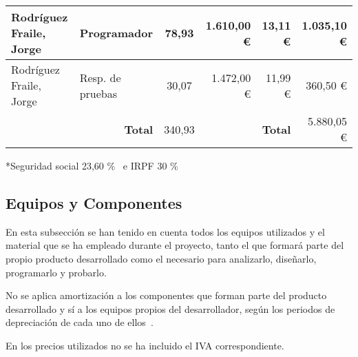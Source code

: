 \begin{table}[H]
{\begin{tabular}{ll|c|rr|r|}
			\multicolumn{1}{|l|}{Rodríguez Fraile, Jorge}                             & Programador                                                 & 78,93                                   & \multicolumn{1}{r|}{1.610,00 €}                              & 13,11 €                                                                              & 1.035,10 €                                                                           \\ \hline
			\multicolumn{1}{|l|}{Rodríguez Fraile, Jorge}                             & Resp. de pruebas                                            & 30,07                                   & \multicolumn{1}{r|}{1.472,00 €}                              & 11,99 €                                                                              & 360,50   €                                                                           \\ \hline
			                                                                          & \multicolumn{1}{r|}{\textbf{Total}}                         & 340,93                                  & \multicolumn{1}{l}{}                                         & \textbf{Total}                                                                       & 5.880,05 €                                                                           \\ \cline{3-3} \cline{6-6}
		\end{tabular}%
	}
\end{table}

*Seguridad social 23,60 \%~\cite{ministerio_de_inclusion_seguridad_social_y_migraciones_bases_nodate} e IRPF 30 \%~\cite{trecet_irpf_nodate}

\subsection{Equipos y Componentes}\label{subsec:equipos-y-componentes}
En esta subsección se han tenido en cuenta todos los equipos utilizados y el material que se ha empleado durante el proyecto, tanto el que formará parte del propio producto desarrollado como el necesario para analizarlo, diseñarlo, programarlo y probarlo.

No se aplica amortización a los componentes que forman parte del producto desarrollado y sí a los equipos propios del desarrollador, según los periodos de depreciación de cada uno de ellos~\cite{thiebaud_-muller_service_2018}.

En los precios utilizados no se ha incluido el IVA correspondiente.

